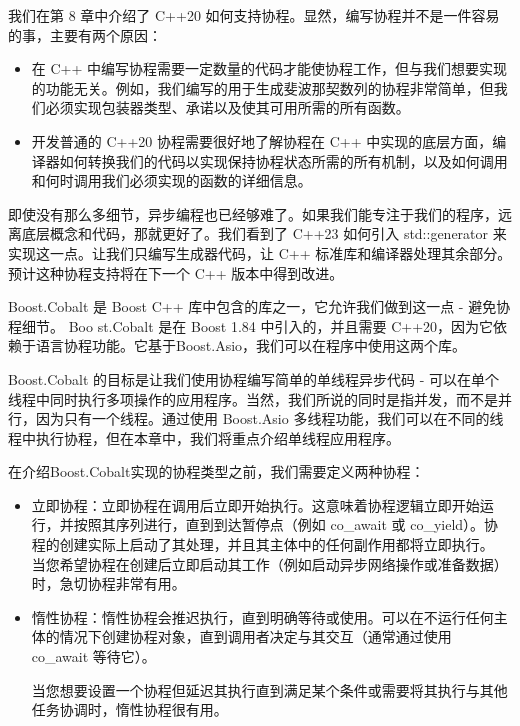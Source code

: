 
我们在第 8 章中介绍了 C++20 如何支持协程。显然，编写协程并不是一件容易的事，主要有两个原因：

\begin{itemize}
\item
在 C++ 中编写协程需要一定数量的代码才能使协程工作，但与我们想要实现的功能无关。例如，我们编写的用于生成斐波那契数列的协程非常简单，但我们必须实现包装器类型、承诺以及使其可用所需的所有函数。

\item
开发普通的 C++20 协程需要很好地了解协程在 C++ 中实现的底层方面，编译器如何转换我们的代码以实现保持协程状态所需的所有机制，以及如何调用和何时调用我们必须实现的函数的详细信息。
\end{itemize}

即使没有那么多细节，异步编程也已经够难了。如果我们能专注于我们的程序，远离底层概念和代码，那就更好了。我们看到了 C++23 如何引入 std::generator 来实现这一点。让我们只编写生成器代码，让 C++ 标准库和编译器处理其余部分。预计这种协程支持将在下一个 C++ 版本中得到改进。

Boost.Cobalt 是 Boost C++ 库中包含的库之一，它允许我们做到这一点 - 避免协程细节。 Boo st.Cobalt 是在 Boost 1.84 中引入的，并且需要 C++20，因为它依赖于语言协程功能。它基于Boost.Asio，我们可以在程序中使用这两个库。

Boost.Cobalt 的目标是让我们使用协程编写简单的单线程异步代码 - 可以在单个线程中同时执行多项操作的应用程序。当然，我们所说的同时是指并发，而不是并行，因为只有一个线程。通过使用 Boost.Asio 多线程功能，我们可以在不同的线程中执行协程，但在本章中，我们将重点介绍单线程应用程序。


在介绍Boost.Cobalt实现的协程类型之前，我们需要定义两种协程：

\begin{itemize}
\item
立即协程：立即协程在调用后立即开始执行。这意味着协程逻辑立即开始运行，并按照其序列进行，直到到达暂停点（例如 co\_await 或 co\_yield）。协程的创建实际上启动了其处理，并且其主体中的任何副作用都将立即执行。
当您希望协程在创建后立即启动其工作（例如启动异步网络操作或准备数据）时，急切协程非常有用。

\item
惰性协程：惰性协程会推迟执行，直到明确等待或使用。可以在不运行任何主体的情况下创建协程对象，直到调用者决定与其交互（通常通过使用 co\_await 等待它）。

当您想要设置一个协程但延迟其执行直到满足某个条件或需要将其执行与其他任务协调时，惰性协程很有用。
\end{itemize}

